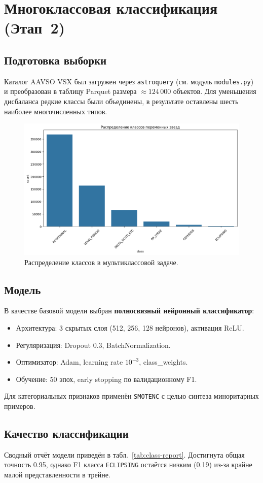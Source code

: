 \documentclass[12pt,a4paper]{article}
\begin{document}
\section{Многоклассовая классификация (Этап~2)}
\subsection{Подготовка выборки}
Каталог AAVSO VSX был загружен через \texttt{astroquery} (см. модуль \texttt{modules.py}) и преобразован в таблицу Parquet размера $\approx124\,000$ объектов.
Для уменьшения дисбаланса редкие классы были объединены, в результате оставлены шесть наиболее многочисленных типов.

\begin{figure}[H]
    \centering
    \includegraphics[width=.7\linewidth]{class_distribution_multiclass.png}
    \caption{Распределение классов в мультиклассовой задаче.}
    \label{fig:multiclass-dist}
\end{figure}

\subsection{Модель}
В качестве базовой модели выбран \textbf{полносвязный нейронный классификатор}:
\begin{itemize}
    \item Архитектура: 3 скрытых слоя (512, 256, 128 нейронов), активация ReLU.
    \item Регуляризация: Dropout 0.3, BatchNormalization.
    \item Оптимизатор: Adam, learning rate $10^{-3}$, class\_weights.
    \item Обучение: 50 эпох, early stopping по валидационному F1.
\end{itemize}
Для категориальных признаков применён \texttt{SMOTENC} с целью синтеза миноритарных примеров.

\subsection{Качество классификации}
Сводный отчёт модели приведён в табл.~\ref{tab:class-report}. 
Достигнута общая точность 0.95, однако F1 класса \texttt{ECLIPSING} остаётся низким (0.19) из-за крайне малой представленности в трейне.
\end{document}
